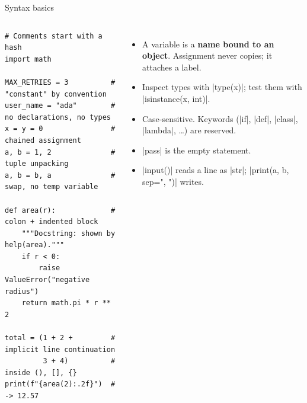 \documentclass[aspectratio=169,9pt]{beamer}
\begin{document}
\begin{frame}[fragile]{Syntax basics}
\begin{columns}[T]
\begin{lstlisting}
# Comments start with a hash
import math

MAX_RETRIES = 3          # "constant" by convention
user_name = "ada"        # no declarations, no types
x = y = 0                # chained assignment
a, b = 1, 2              # tuple unpacking
a, b = b, a              # swap, no temp variable

def area(r):             # colon + indented block
    """Docstring: shown by help(area)."""
    if r < 0:
        raise ValueError("negative radius")
    return math.pi * r ** 2

total = (1 + 2 +         # implicit line continuation
         3 + 4)          # inside (), [], {}
print(f"{area(2):.2f}")  # -> 12.57
\end{lstlisting}
\begin{itemize}\setlength\itemsep{5pt}
  \item A variable is a \textbf{name bound to an object}.
        Assignment never copies; it attaches a label.
  \item Inspect types with |type(x)|; test them with
        |isinstance(x, int)|.
  \item Case-sensitive. Keywords (|if|, |def|, |class|, |lambda|,
        \ldots) are reserved.
  \item |pass| is the empty statement.
  \item |input()| reads a line as |str|;
        |print(a, b, sep=", ")| writes.
\end{itemize}
\end{columns}
\end{frame}
\end{document}
